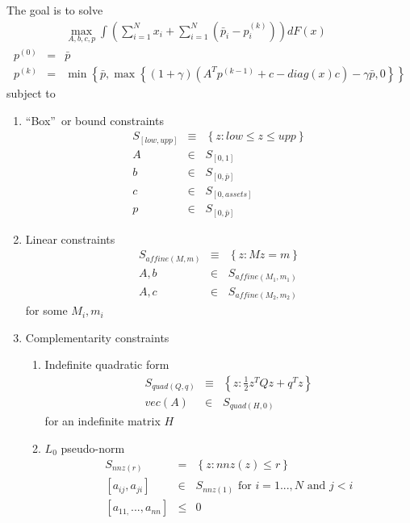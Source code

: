 \documentclass{article}
\begin{document}
The goal is to solve%
\begin{eqnarray*}
&&\max_{A,b,c,p}\int \left( \sum_{i=1}^{N}x_{i}+\sum_{i=1}^{N}\left( \bar{p}%
_{i}-p_{i}^{\left( k\right) }\right) \right) dF\left( x\right) \\
p^{\left( 0\right) } &=&\bar{p} \\
p^{\left( k\right) } &=&\min \left\{ \bar{p},\max \left\{ \left( 1+\gamma
\right) \left( A^{T}p^{\left( k-1\right) }+c-diag\left( x\right) c\right)
-\gamma \bar{p},0\right\} \right\}
\end{eqnarray*}%
subject to

\begin{enumerate}
\item \textquotedblleft Box\textquotedblright\ or bound constraints%
\begin{eqnarray*}
S_{\left[ low,upp\right] } &\equiv &\left\{ z:low\leq z\leq upp\right\} \\
A &\in &S_{\left[ 0,1\right] } \\
b &\in &S_{\left[ 0,\bar{p}\right] } \\
c &\in &S_{\left[ 0,assets\right] } \\
p &\in &S_{\left[ 0,\bar{p}\right] }
\end{eqnarray*}

\item Linear constraints%
\begin{eqnarray*}
S_{affine\left( M,m\right) } &\equiv &\left\{ z:Mz=m\right\} \\
A,b &\in &S_{affine\left( M_{1},m_{1}\right) } \\
A,c &\in &S_{affine\left( M_{2},m_{2}\right) }
\end{eqnarray*}%
for some $M_{i},m_{i}$

\item Complementarity constraints

\begin{enumerate}
\item Indefinite quadratic form%
\begin{eqnarray*}
S_{quad\left( Q,q\right) } &\equiv &\left\{ z:\frac{1}{2}z^{T}Qz+q^{T}z%
\right\} \\
vec\left( A\right) &\in &S_{quad\left( H,0\right) }
\end{eqnarray*}
for an indefinite matrix $H$

\item $L_{0}$ pseudo-norm%
\begin{eqnarray*}
S_{nnz\left( r\right) } &=&\left\{ z:nnz\left( z\right) \leq r\right\} \\
\left[ a_{ij},a_{ji}\right] &\in &S_{nnz\left( 1\right) }\text{ for }i=1...,N%
\text{ and }j<i \\
\left[ a_{11,}...,a_{nn}\right] &\leq &0
\end{eqnarray*}
\end{enumerate}
\end{enumerate}
\end{document}
